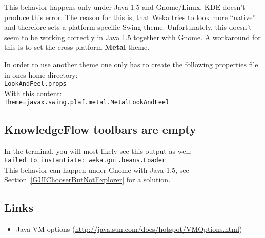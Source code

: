 \noindent This behavior happens only under Java 1.5 and Gnome/Linux,
KDE doesn't produce this error. The reason for this is, that Weka
tries to look more ``native'' and therefore sets a platform-specific
Swing theme. Unfortunately, this doesn't seem to be working correctly
in Java 1.5 together with Gnome. A workaround for this is to set the
cross-platform \textbf{Metal} theme.

In order to use another theme one only has to create the following
properties file in ones home directory:\\

\verb=LookAndFeel.props=\\

\noindent With this content:\\

\verb^Theme=javax.swing.plaf.metal.MetalLookAndFeel^\\

\subsection{KnowledgeFlow toolbars are empty}
In the terminal, you will most likely see this output as well:\\

\verb=Failed to instantiate: weka.gui.beans.Loader=\\

\noindent This behavior can happen under Gnome with Java 1.5, see
Section~\ref{GUIChooserButNotExplorer} for a solution.

\subsection{Links}
\begin{itemize}
\item Java VM options (\url{http://java.sun.com/docs/hotspot/VMOptions.html}{})
\end{itemize}


